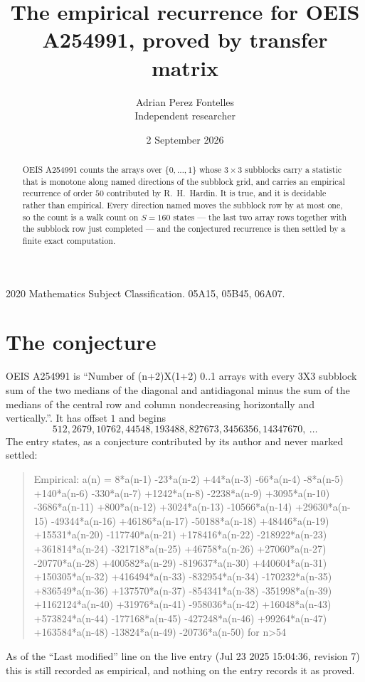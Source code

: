 \documentclass[11pt,a4paper]{article}
\title{The empirical recurrence for OEIS A254991, proved by transfer matrix}
\author{Adrian Perez Fontelles\\ \small Independent researcher}
\date{2 September 2026}
\theoremstyle{plain}
\theoremstyle{definition}
\begin{document}
\maketitle

\begin{abstract}
OEIS A254991 counts the arrays over $\{0,\dots,1\}$ whose $3\times3$ subblocks carry a
statistic that is monotone along named directions of the subblock grid, and carries an
empirical recurrence of order $50$ contributed by R.~H.~Hardin. It is true, and it is
decidable rather than empirical. Every direction named moves the subblock row by at most one,
so the count is a walk count on $S=160$ states --- the last two array rows together with the
subblock row just completed --- and the conjectured recurrence is then settled by a finite
exact computation.
\end{abstract}

\noindent\small 2020 Mathematics Subject Classification. 05A15, 05B45, 06A07.\normalsize

\section{The conjecture}

OEIS A254991 is ``Number of (n+2)X(1+2) 0..1 arrays with every 3X3 subblock sum of the two medians of the diagonal and antidiagonal minus the sum of the medians of the central row and column nondecreasing horizontally and vertically.''. It has offset $1$ and begins
\[
512, 2679, 10762, 44548, 193488, 827673, 3456356, 14347670,\ \dots
\]
The entry states, as a conjecture contributed by its author and never marked settled:
\begin{quote}
Empirical: a(n) = 8*a(n-1) -23*a(n-2) +44*a(n-3) -66*a(n-4) -8*a(n-5) +140*a(n-6) -330*a(n-7) +1242*a(n-8) -2238*a(n-9) +3095*a(n-10) -3686*a(n-11) +800*a(n-12) +3024*a(n-13) -10566*a(n-14) +29630*a(n-15) -49344*a(n-16) +46186*a(n-17) -50188*a(n-18) +48446*a(n-19) +15531*a(n-20) -117740*a(n-21) +178416*a(n-22) -218922*a(n-23) +361814*a(n-24) -321718*a(n-25) +46758*a(n-26) +27060*a(n-27) -20770*a(n-28) +400582*a(n-29) -819637*a(n-30) +440604*a(n-31) +150305*a(n-32) +416494*a(n-33) -832954*a(n-34) -170232*a(n-35) +836549*a(n-36) +137570*a(n-37) -854341*a(n-38) -351998*a(n-39) +1162124*a(n-40) +31976*a(n-41) -958036*a(n-42) +16048*a(n-43) +573824*a(n-44) -177168*a(n-45) -427248*a(n-46) +99264*a(n-47) +163584*a(n-48) -13824*a(n-49) -20736*a(n-50) for n>54
\end{quote}
As of the ``Last modified'' line on the live entry (Jul 23 2025 15:04:36, revision 7) this is still
recorded as empirical, and nothing on the entry records it as proved.
\end{document}
